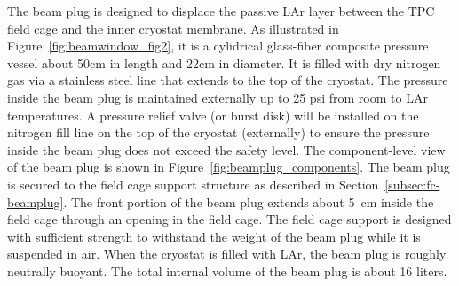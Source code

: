 
The beam plug is designed to displace the passive LAr layer between the TPC field cage and the inner cryostat membrane. As illustrated in Figure~\ref{fig:beamwindow_fig2}, it is a cylidrical glass-fiber composite pressure vessel about 50cm in length and  22cm in diameter. It is filled with dry nitrogen gas via a stainless steel line that extends to the top of the cryostat. The pressure inside the beam plug is maintained externally up to 25 psi from room to LAr temperatures. A pressure relief valve (or burst disk) will be installed on the nitrogen fill line on the top of the cryostat (externally) to ensure the pressure inside the beam plug does not exceed the safety level. The component-level view of the beam plug is shown in Figure~\ref{fig:beamplug_components}.  The beam plug is secured to the field cage support structure as described in Section~\ref{subsec:fc-beamplug}. The front portion of the beam plug extends about 5~cm inside the field cage through an opening in the field cage. The field cage support is designed with sufficient strength to withstand the weight of the beam plug while it is suspended in air. 
When the cryostat is filled with LAr, the beam plug is roughly neutrally buoyant.  The total internal volume of the beam plug is about 16 liters. 

